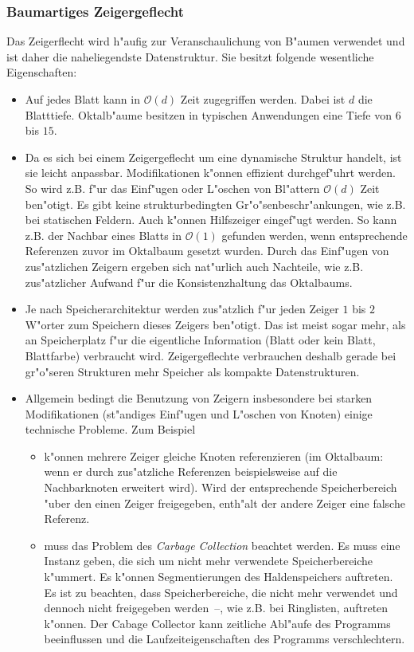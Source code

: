 \subsubsection{Baumartiges Zeigergeflecht}
Das Zeigerflecht wird h"aufig zur Veranschaulichung von B"aumen verwendet und 
ist daher die naheliegendste Datenstruktur. Sie besitzt folgende wesentliche 
Eigenschaften:
\begin{itemize}
\item Auf jedes Blatt kann in $\mathcal{O}(d)$ Zeit zugegriffen werden. 
    Dabei ist $d$ die Blatttiefe. Oktalb"aume besitzen in typischen 
    Anwendungen eine Tiefe von $6$ bis $15$.
\item Da es sich bei einem Zeigergeflecht um eine dynamische Struktur handelt, 
    ist sie leicht anpassbar. Modifikationen k"onnen effizient durchgef"uhrt 
    werden. So wird z.B. f"ur das Einf"ugen oder L"oschen von Bl"attern 
    $\mathcal{O}(d)$ Zeit ben"otigt. Es gibt keine strukturbedingten 
    Gr"o"senbeschr"ankungen, wie z.B. bei statischen Feldern. Auch k"onnen 
    Hilfszeiger eingef"ugt werden. So kann z.B. der Nachbar eines Blatts 
    in $\mathcal{O}(1)$ gefunden werden, wenn entsprechende Referenzen zuvor 
    im Oktalbaum gesetzt wurden. Durch das Einf"ugen von zus"atzlichen 
    Zeigern ergeben sich nat"urlich auch Nachteile, wie z.B. zus"atzlicher 
    Aufwand f"ur die Konsistenzhaltung das Oktalbaums.
\item Je nach Speicherarchitektur werden zus"atzlich f"ur jeden Zeiger 
    $1$ bis $2$ W"orter zum Speichern dieses Zeigers ben"otigt. Das ist 
    meist sogar mehr, als an Speicherplatz f"ur die eigentliche Information 
    (Blatt oder kein Blatt, Blattfarbe) verbraucht wird. Zeigergeflechte 
    verbrauchen deshalb gerade bei gr"o"seren Strukturen mehr Speicher 
    als kompakte Datenstrukturen.
\item Allgemein bedingt die Benutzung von Zeigern insbesondere bei starken 
    Modifikationen (st"andiges Einf"ugen und L"oschen von Knoten) einige 
    technische Probleme. Zum Beispiel 
    \begin{itemize}
    \item k"onnen mehrere Zeiger gleiche Knoten referenzieren (im Oktalbaum: 
	wenn er durch zus"atzliche Referenzen beispielsweise auf die 
	Nachbarknoten erweitert wird). Wird der entsprechende 
	Speicherbereich "uber den einen Zeiger freigegeben, enth"alt der 
	andere Zeiger eine falsche Referenz.
    \item muss das Problem des \emph{Carbage Collection} beachtet werden. 
	Es muss eine Instanz geben, die sich um nicht mehr verwendete  
	Speicherbereiche k"ummert. Es k"onnen Segmentierungen des 
	Haldenspeichers auftreten. Es ist zu beachten, dass Speicherbereiche, 
	die nicht mehr verwendet und dennoch nicht freigegeben werden~--, wie 
	z.B. bei Ringlisten, auftreten k"onnen.
	Der Cabage Collector kann zeitliche Abl"aufe des Programms 
	beeinflussen und die Laufzeiteigenschaften des Programms 
	verschlechtern.  
    \end{itemize}
\end{itemize}

